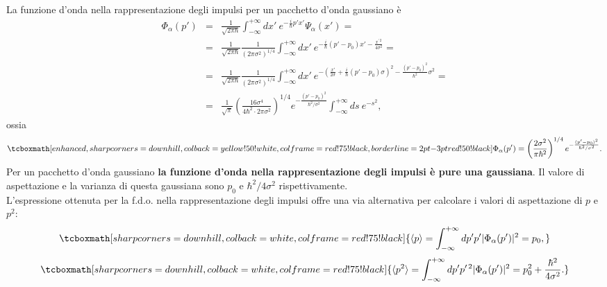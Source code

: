 \documentclass[a4paper,12pt,oneside]{book}
\begin{document}
La funzione d'onda nella rappresentazione degli impulsi per un pacchetto d'onda gaussiano è
	\begin{eqnarray}
		\Phi_\alpha(p') &=& \frac{1}{\sqrt{2 \pi \hbar}} \int_{-\infty}^{+\infty} dx'~ e^{-\frac{i}{\hbar} p' x'} \Psi_\alpha(x') = \nonumber \\
		&=& \frac{1}{\sqrt{2 \pi \hbar}} \frac{1}{(2 \pi \sigma^2)^{1/4}} \int_{-\infty}^{+\infty} dx'~ e^{-\frac{i}{\hbar} (p'-p_0) x' - \frac{x^{\prime \, 2}}{4 \sigma^2}} = \nonumber \\
		&=& \frac{1}{\sqrt{2 \pi \hbar}} \frac{1}{(2 \pi \sigma^2)^{1/4}} \int_{-\infty}^{+\infty} dx'~ e^{-\left(\frac{x'}{2 \sigma} + \frac{i}{\hbar} (p'-p_0) \sigma \right)^2 - \frac{(p'-p_0)^2}{\hbar^2}\sigma^2} = \nonumber \\
		&=&  \frac{1}{\sqrt{\pi}} \left(\frac{16 \sigma^4}{4 \hbar^2 \cdot 2 \pi \sigma^2} \right)^{1/4} e^{-\frac{(p'-p_0)^2}{\hbar^2/\sigma^2}} \int_{-\infty}^{+\infty} ds ~e^{-s^2},
	\end{eqnarray}
ossia
	\begin{equation}
		\tcboxmath[enhanced,sharp corners=downhill ,colback=yellow!50!white,colframe=red!75!black, borderline={2pt}{-3pt}{red!50!black}]{
			\Phi_\alpha(p') = \left(\frac{2 \sigma^2}{\pi \hbar^2} \right)^{1/4} e^{-\frac{(p'-p_0)^2}{\hbar^2/\sigma^2}}.
			}
	\end{equation}
Per un pacchetto d'onda gaussiano \textbf{la funzione d'onda nella rappresentazione degli impulsi è pure una gaussiana}. Il valore di aspettazione e la varianza di questa gaussiana sono $p_0$ e $\hbar^2/4 \sigma^2$ rispettivamente.\\

L'espressione ottenuta per la f.d.o. nella rappresentazione degli impulsi offre una via alternativa per calcolare i valori di aspettazione di $p$ e $p^2$:
	\begin{equation}
		\tcboxmath[sharp corners=downhill ,colback=white,colframe=red!75!black]{
		\langle p \rangle = \int_{-\infty}^{+\infty} dp' p' |\Phi_\alpha(p')|^2 = p_0,
			}
	\end{equation}
	\begin{equation}
		\tcboxmath[sharp corners=downhill ,colback=white,colframe=red!75!black]{
		\langle p^2 \rangle = \int_{-\infty}^{+\infty} dp' p^{\prime \, 2} |\Phi_\alpha(p')|^2 = p_0^2 + \frac{\hbar^2}{4 \sigma^2}.
			}
	\end{equation}
\end{document}

